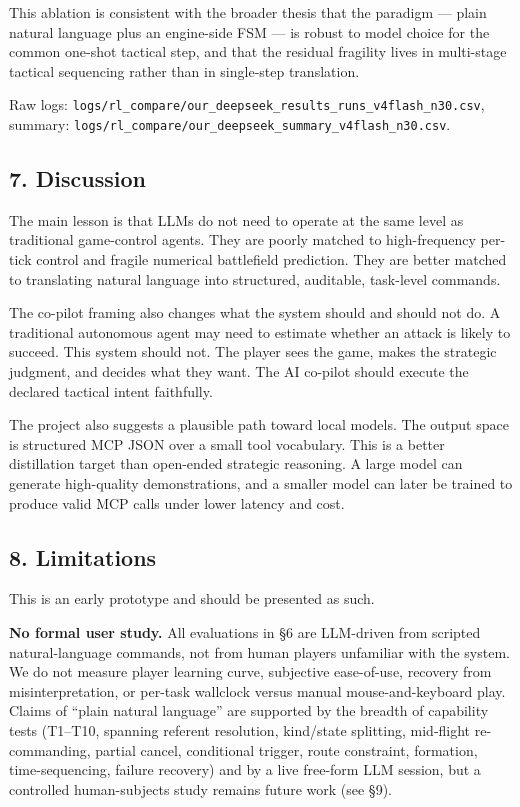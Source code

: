 \documentclass[
  journal]{IEEEtran}
\begin{document}
This ablation is consistent with the broader thesis that the paradigm
--- plain natural language plus an engine-side FSM --- is robust to
model choice for the common one-shot tactical step, and that the
residual fragility lives in multi-stage tactical sequencing rather than
in single-step translation.

Raw logs:
\texttt{logs/rl\_compare/our\_deepseek\_results\_runs\_v4flash\_n30.csv},
summary:
\texttt{logs/rl\_compare/our\_deepseek\_summary\_v4flash\_n30.csv}.

\subsection{7. Discussion}\label{discussion}

The main lesson is that LLMs do not need to operate at the same level as
traditional game-control agents. They are poorly matched to
high-frequency per-tick control and fragile numerical battlefield
prediction. They are better matched to translating natural language into
structured, auditable, task-level commands.

The co-pilot framing also changes what the system should and should not
do. A traditional autonomous agent may need to estimate whether an
attack is likely to succeed. This system should not. The player sees the
game, makes the strategic judgment, and decides what they want. The AI
co-pilot should execute the declared tactical intent faithfully.

The project also suggests a plausible path toward local models. The
output space is structured MCP JSON over a small tool vocabulary. This
is a better distillation target than open-ended strategic reasoning. A
large model can generate high-quality demonstrations, and a smaller
model can later be trained to produce valid MCP calls under lower
latency and cost.

\subsection{8. Limitations}\label{limitations}

This is an early prototype and should be presented as such.

\textbf{No formal user study.} All evaluations in §6 are LLM-driven from
scripted natural-language commands, not from human players unfamiliar
with the system. We do not measure player learning curve, subjective
ease-of-use, recovery from misinterpretation, or per-task wallclock
versus manual mouse-and-keyboard play. Claims of ``plain natural
language'' are supported by the breadth of capability tests (T1--T10,
spanning referent resolution, kind/state splitting, mid-flight
re-commanding, partial cancel, conditional trigger, route constraint,
formation, time-sequencing, failure recovery) and by a live free-form
LLM session, but a controlled human-subjects study remains future work
(see §9).
\end{document}
